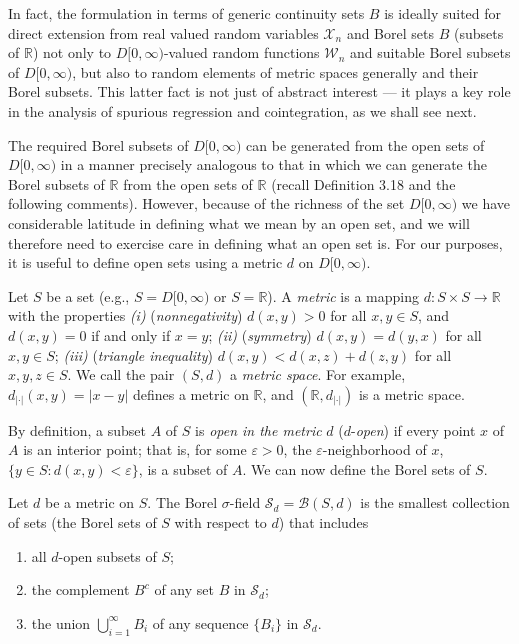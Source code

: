 In fact, the formulation in terms of generic continuity sets $B$ is ideally suited for direct extension from real valued random variables $\mathcal{X}_n$ and Borel sets $B$ (subsets of $\mathbb{R}$) not only to $D[0,\infty)$-valued random functions $\mathcal{W}_n$ and suitable Borel subsets of $D[0,\infty)$, but also to random elements of metric spaces generally and their Borel subsets. This latter fact is not just of abstract interest --- it plays a key role in the analysis of spurious regression and cointegration, as we shall see next.

The required Borel subsets of $D[0,\infty)$ can be generated from the open sets of $D[0,\infty)$ in a manner precisely analogous to that in which we can generate the Borel subsets of $\mathbb{R}$ from the open sets of $\mathbb{R}$ (recall Definition 3.18 and the following comments). However, because of the richness of the set $D[0,\infty)$ we have considerable latitude in defining what we mean by an open set, and we will therefore need to exercise care in defining what an open set is. For our purposes, it is useful to define open sets using a metric $d$ on $D[0,\infty)$.

Let $S$ be a set (e.g., $S = D[0,\infty)$ or $S = \mathbb{R}$). A \emph{metric} is a mapping $d : S \times S \to \mathbb{R}$ with the properties \emph{(i)} (\emph{nonnegativity}) $d(x,y) > 0$ for all $x, y \in S$, and $d(x,y) = 0$ if and only if $x = y$; \emph{(ii)} (\emph{symmetry}) $d(x,y) = d(y,x)$ for all $x, y \in S$; \emph{(iii)} (\emph{triangle inequality}) $d(x,y) < d(x,z) + d(z,y)$ for all $x, y, z \in S$. We call the pair $(S,d)$ a \emph{metric space}. For example, $d_{|\cdot|}(x,y) = |x - y|$ defines a metric on $\mathbb{R}$, and $(\mathbb{R}, d_{|\cdot|})$ is a metric space.

By definition, a subset $A$ of $S$ is \emph{open in the metric} $d$ ($d$-\emph{open}) if every point $x$ of $A$ is an interior point; that is, for some $\varepsilon > 0$, the $\varepsilon$-neighborhood of $x$, $\{y \in S : d(x,y) < \varepsilon\}$, is a subset of $A$. We can now define the Borel sets of $S$.

\begin{definition}\label{def:borel-sigma-field-ch7}
Let $d$ be a metric on $S$. The Borel $\sigma$-field $\mathcal{S}_d = \mathcal{B}(S,d)$ is the smallest collection of sets (the Borel sets of $S$ with respect to $d$) that includes
\begin{enumerate}[label=(\roman*)]
\item all $d$-open subsets of $S$;
\item the complement $B^c$ of any set $B$ in $\mathcal{S}_d$;
\item the union $\bigcup_{i=1}^{\infty} B_i$ of any sequence $\{B_i\}$ in $\mathcal{S}_d$.
\end{enumerate}
\end{definition}

